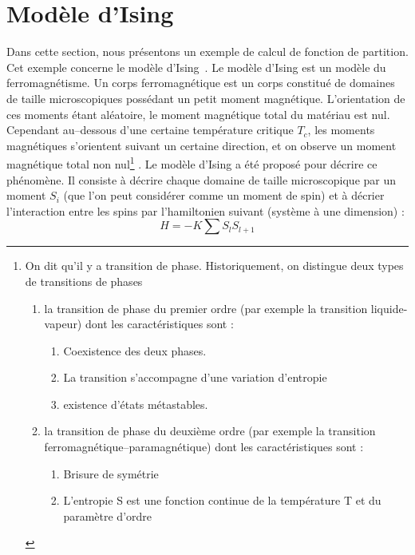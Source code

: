 \documentclass[12pt]{book}
\begin{document}
\section{Mod\`ele d'Ising}\label{secmodising}
Dans cette section, nous pr\'esentons un exemple de calcul de fonction
de partition. Cet exemple concerne le mod\`ele d'Ising\
\cite{ma:equad:Schuster88,ph:physt:LeBellac88,ph:physt:Diu89}. Le
mod\`ele d'Ising\index{Ising} est un 
mod\`ele du ferromagn\'etisme. Un corps
ferromagn\'etique est un 
corps constitu\'e de domaines de taille microscopiques poss\'edant un
petit moment magn\'etique. L'orientation de ces moments \'etant
al\'eatoire, le moment magn\'etique total du mat\'eriau est nul.
Cependant au--dessous d'une certaine temp\'erature critique $T_c$, les
moments magn\'etiques s'orientent suivant un certaine direction, et on
observe un moment magn\'etique total non nul\footnote{%
On dit qu'il y a transition de phase.
Historiquement, on distingue 
deux types de transitions de phases \cite{ph:physt:Diu89}
\begin {enumerate}
\item la transition de phase du premier ordre
(par exemple la transition liquide-vapeur)
dont les caract\'eristiques sont :
\begin{enumerate}
\item Coexistence des deux phases.
\item La transition s'accompagne d'une variation d'entropie
\item existence d'\'etats m\'etastables.
\end{enumerate}
\item la transition de phase du deuxi\`eme  ordre
(par exemple la transition ferromagn\'etique--paramagn\'etique) dont
les caract\'eristiques sont : 
\begin{enumerate}
\item Brisure de sym\'etrie
\item L'entropie S est une fonction continue de la temp\'erature T et du
param\`etre d'ordre
\end{enumerate}
\end{enumerate}
}%
. Le mod\`ele d'Ising a
\'et\'e propos\'e pour d\'ecrire ce ph\'enom\`ene. Il consiste \`a
d\'ecrire chaque domaine de taille microscopique par un moment $S_i$
(que l'on peut consid\'erer comme un moment de spin)\index{spin} et \`a d\'ecrier
l'interaction entre les spins par l'hamiltonien suivant (syst\`eme \`a
une dimension) :
\begin{equation}
H=-K\sum S_lS_{l+1}
\end{equation}
\end{document}
